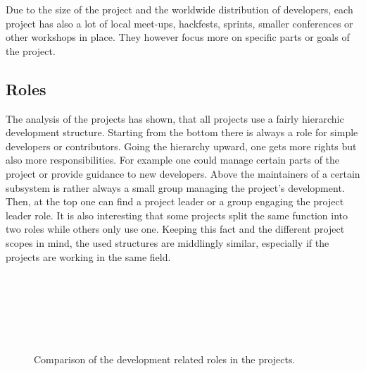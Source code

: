 Due to the size of the project and the worldwide distribution of developers,
each project has also a lot of local meet-ups, hackfests, sprints, smaller
conferences or other workshops in place. They however focus more on specific
parts or goals of the project.


\subsection{Roles} %
\label{sub:Roles}

The analysis of the projects has shown, that all projects use a fairly
hierarchic development structure. Starting from the bottom there is always a
role for simple developers or contributors. Going the hierarchy upward, one
gets more rights but also more responsibilities. For example one could manage
certain parts of the project or provide guidance to new developers. Above the
maintainers of a certain subsystem is rather always a small group managing the
project's development. Then, at the top one can find a project leader or a
group engaging the project leader role. It is also interesting that some
projects split the same function into two roles while others only use one.
Keeping this fact and the different project scopes in mind, the used structures
are middlingly similar, especially if the projects are working in the same
field.

\begin{figure}[htbp]
  \centering
   \qquad
   \\

   \qquad
   \\

   \qquad
   \\

   \qquad
   \\

   \qquad
   \\
  \caption{Comparison of the development related roles in the projects.}
\end{figure}

